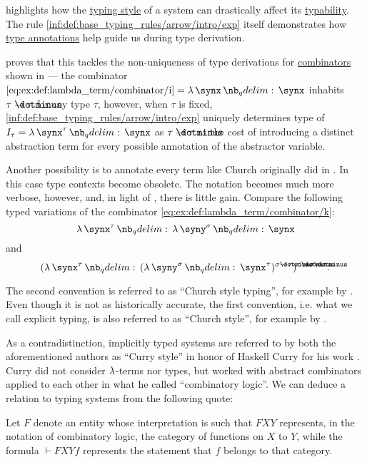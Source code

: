 \begin{remark}\label{rem:typing_style}
   highlights how the \hyperref[def:simple_type_system_style]{typing style} of a system can drastically affect its \hyperref[def:typability]{typability}. The rule \ref{inf:def:base_typing_rules/arrow/intro/exp} itself demonstrates how \hyperref[con:type_annotation]{type annotations} help guide us during type derivation.

   proves that this tackles the non-uniqueness of type derivations for \hyperref[def:lambda_combinator]{combinators} shown in  --- the combinator \( \ref{eq:ex:def:lambda_term/combinator/i} = \qabs \synx \synx \) inhabits \( \tau \synimplies \tau \) for any type \( \tau \), however, when \( \tau \) is fixed, \ref{inf:def:base_typing_rules/arrow/intro/exp} uniquely determines  type of \( I_\tau = \qabs {\synx^\tau} \synx \) as \( \tau \synimplies \tau \) at the cost of introducing a distinct abstraction term for every possible annotation of the abstractor variable.

  Another possibility is to annotate every term like Church originally did in \cite{Church1940STT}. In this case type contexts become obsolete. The notation becomes much more verbose, however, and, in light of , there is little gain. Compare the following typed variations of the combinator \ref{eq:ex:def:lambda_term/combinator/k}:
  \begin{equation*}
    \qabs {\synx^\tau} \qabs {\syny^\sigma} \synx
  \end{equation*}
  and
  \begin{equation*}
    (\qabs {\synx^\tau} (\qabs {\syny^\sigma} \synx^\tau)^{\sigma \synimplies \tau})^{\tau \synimplies \sigma \synimplies \tau}.
  \end{equation*}

  The second convention is referred to as \enquote{Church style typing}, for example by \cite[ch. 5]{Hindley1997STT}. Even though it is not as historically accurate, the first convention, i.e. what we call explicit typing, is also referred to as \enquote{Church style}, for example by .

  As a contradistinction, implicitly typed systems are referred to by both the aforementioned authors as \enquote{Curry style} in honor of Haskell Curry for his work \cite{Curry1934CombinatoryLogic}. Curry did not consider \( \mathrm{\lambda} \)-terms nor types, but worked with abstract combinators applied to each other in what he called \enquote{combinatory logic}. We can deduce a relation to typing systems from the following quote:
  \begin{displayquote}
    Let \( F \) denote an entity whose interpretation is such that \( FXY \) represents, in the notation of combinatory logic, the category of functions on \( X \) to \( Y \), while the formula \( \vdash FXYf \) represents the statement that \( f \) belongs to that category.
  \end{displayquote}


\end{remark}
